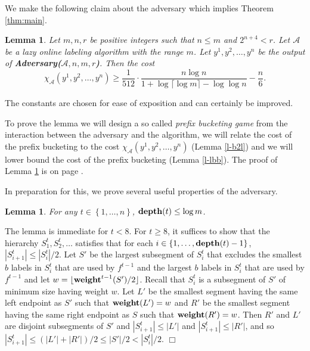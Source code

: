 \documentclass[11pt]{article}
\newtheorem{lemma}[theorem]{Lemma}
\newcommand{\qed}{$\Box$}
\newenvironment{proof}{\noindent {\bf Proof:}}{\hfill \qed \smallskip}
\newcommand{\A}{\mathcal{A}}
\newcommand{\natInt}[2]{ \left\{ #1, \dotsc, #2 \right\} }
\newcommand{\weight}{{\rm {\bf weight}}}
\newcommand{\depth}{{\rm {\bf depth}}}
\begin{document}
We make the following claim about the adversary which implies Theorem \ref{thm:main}.

\begin{lemma}\label{l-main}
Let $m,n,r$ be positive integers such that $n \le m$ 
and $2^{n+4}<r$. %
Let $\A$ be a lazy online labeling algorithm with the range $m$.
Let $y^1,y^2,\dotsc,y^n$ be the output of {\bf Adversary($\A,n,m,r$)}.
Then the cost $$\chi_\A(y^1,y^2,\dotsc,y^n) \ge \frac{1}{512} \cdot \frac{n \log n}{ 1 + \log \lceil \log m \rceil - \log \log n} - \frac{n}{6}.$$
\end{lemma}

 The constants are chosen for
ease of exposition and can certainly be improved.
%


To prove the lemma we will design a so called \emph{prefix bucketing game} from the interaction between the
adversary and the algorithm, we will relate the cost of the prefix bucketing to the cost $\chi_\A(y^1,y^2,\dotsc,y^n)$ (Lemma \ref{l-b2l})
and we will lower bound the cost of the prefix bucketing (Lemma \ref{l-lbb}). The proof of Lemma \ref{l-main} is on page \pageref{pf-main}.

In preparation for this, we prove several useful properties of the adversary.

\begin{lemma}
For any $t\in \natInt{1}{n}$, $\depth(t)\le \log m$.
\end{lemma}

\begin{proof}
The lemma is immediate for $t <8$.
For $t\ge 8$, it suffices to show that the hierarchy $S^t_1,S^t_2,\dotsc$ satisfies that for each $i \in \natInt{1}{\depth(t)-1}$,
$|S^t_{i+1}| \leq |S^t_{i}|/2$.   Let $S'$ be the largest subsegment of $S^t_{i}$ that excludes the
smallest $b$  labels in $S^t_i$ that are used by $f^{t-1}$ 
and the largest $b$ labels  in $S^t_i$ that are used by $f^{t-1}$ and let $w= \lfloor \weight^{t-1}(S')/2 \rfloor$.
 Recall that $S^t_i$ is a subsegment of $S'$ of minimum size having weight $w$.
Let $L'$ be the smallest segment having the same
left endpoint as $S'$ such that $\weight(L')=w$ and $R'$ be the smallest
segment having the same right endpoint as $S$ such that $\weight(R')=w$. Then
$R'$ and $L'$ are disjoint subsegments of $S'$ and $|S^t_{i+1}| \leq |L'|$ and $|S^t_{i+1}| \leq |R'|$,
and so
 $|S^t_{i+1}| \leq (|L'|+|R'|)/2 \leq |S'|/2 < |S^t_i|/2$.
\end{proof}
\end{document}
